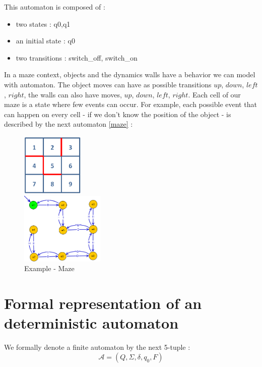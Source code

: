 This automaton is composed of :
\begin{itemize}
\item two states : {q0,q1}
\item an initial state : {q0}
\item two transitions : {switch\_off, switch\_on}
\end{itemize}

In a maze context, objects and the dynamics walls have a behavior we can model with automaton. The object moves can have as possible transitions $up$, $down$, $left$, $right$, the walls can also have moves, $up$, $down$, $left$, $right$. Each cell of our maze is a state where few events can occur. For example, each possible event that can happen on every cell - if we don't know the position of the object - is described by the next automaton \ref{maze} :

\begin{figure}[H]
\begin{minipage}{0.5 \textwidth}	
      \begin{center}
      \includegraphics[width = 3cm]{./IV/3x3lab.png}
      \caption{Example - Maze}
      \end{center}
\end{minipage}
\begin{minipage}{0.5 \textwidth}
\begin{center}
      \includegraphics[width = 4cm]{./IV/3x3autom.png}
      \end{center}
\end{minipage}
\end{figure}


\section{Formal representation of an deterministic automaton}
We formally denote a finite automaton by the next 5-tuple :
\begin{equation}
\mathcal{A} = ( Q, \Sigma,\delta,q_0,F )
\end{equation}

